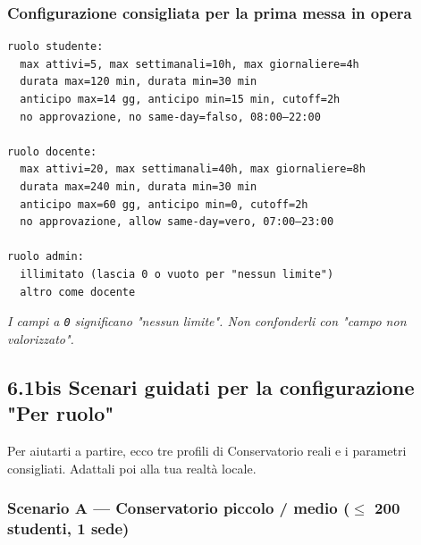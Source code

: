 \documentclass[11pt,a4paper]{article}
\renewenvironment{quote}
  {\begin{list}{}{%
      \setlength{\leftmargin}{8pt}%
      \setlength{\rightmargin}{8pt}%
      \setlength{\topsep}{6pt}%
      \setlength{\parsep}{0pt}}%
      \item\relax\color{black!75}\itshape}
  {\end{list}}
\begin{document}
\subsubsection{Configurazione consigliata per la prima messa in opera}


\begin{lstlisting}
ruolo studente:
  max attivi=5, max settimanali=10h, max giornaliere=4h
  durata max=120 min, durata min=30 min
  anticipo max=14 gg, anticipo min=15 min, cutoff=2h
  no approvazione, no same-day=falso, 08:00–22:00

ruolo docente:
  max attivi=20, max settimanali=40h, max giornaliere=8h
  durata max=240 min, durata min=30 min
  anticipo max=60 gg, anticipo min=0, cutoff=2h
  no approvazione, allow same-day=vero, 07:00–23:00

ruolo admin:
  illimitato (lascia 0 o vuoto per "nessun limite")
  altro come docente
\end{lstlisting}

\begin{quote}
I campi a \texttt{0} significano "nessun limite". Non confonderli con "campo non valorizzato".
\end{quote}

\subsection{6.1bis Scenari guidati per la configurazione "Per ruolo"}


Per aiutarti a partire, ecco tre profili di Conservatorio reali e i parametri consigliati. Adattali poi alla tua realtà locale.

\subsubsection{Scenario A --- Conservatorio piccolo / medio ($\leq$ 200 studenti, 1 sede)}
\end{document}
